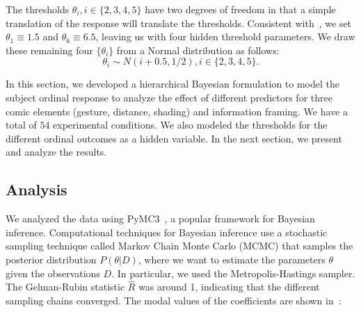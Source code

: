 The thresholds $\theta_i, i \in \{2, 3, 4, 5\}$ have two degrees of freedom in that a simple translation of the response will translate the thresholds. Consistent with~\textcite[][p. 674]{Kruschke2014}, we set $\theta_1\equiv1.5$ and $\theta_6\equiv6.5$, leaving us with four hidden threshold parameters. We draw these remaining four $\{ \theta_i\}$ from a Normal distribution as follows:
\begin{equation}
 \theta_i \sim N(i+0.5, 1/2), i \in \{2, 3, 4, 5\}.
\end{equation}

In this section, we developed a hierarchical Bayesian formulation to model the subject ordinal response to analyze the effect of different predictors for three comic elements (gesture, distance, shading) and information framing. We have a total of $54$ experimental conditions. We also modeled the thresholds for the different ordinal outcomes as a hidden variable. In the next section, we present and analyze the results.

\subsection{Analysis}
\label{sub:Analysis}

We analyzed the data using PyMC3~\cite{Salvatier2016}, a popular framework for Bayesian inference. Computational techniques for Bayesian inference use a stochastic sampling technique called Markov Chain Monte Carlo (MCMC) that samples the posterior distribution $P(\theta | D)$, where we want to estimate the parameters $\theta$ given the observations $D$. In particular, we used the Metropolis-Hastings sampler. The Gelman-Rubin statistic $\hat{R}$ was around 1, indicating that the different sampling chains converged. The modal values of the coefficients are shown in~:

